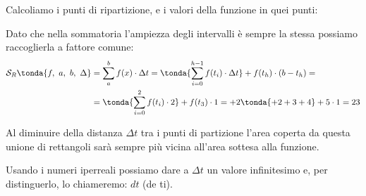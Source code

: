 \begin{esempio}
Calcoliamo i punti di ripartizione, e i valori della funzione in quei 
punti:

\vspace{.5em}

Dato che nella sommatoria l'ampiezza degli intervalli è sempre la stessa 
possiamo raccoglierla a fattore comune:
\begin{align*}
\mathcal{S}_R \tonda{f,~a,~b,~\Delta} &= \sum_a^b f(x) \cdot \Delta t =
   \tonda{\sum_{i=0}^{h -1} f(t_i) \cdot \Delta t} +f(t_h)\cdot(b-t_h) = \\
&= \tonda{\sum_{i=0}^{2} f(t_i) \cdot 2} +f(t_3) \cdot 1 = 
   +2 \tonda{+2+3+4} + 5 \cdot 1 = 23
\end{align*}
\end{esempio}

\begin{newoss*}{}{}
Al diminuire della distanza \(\Delta t\) tra i punti di partizione l'area 
coperta da questa unione di rettangoli sarà sempre più vicina all'area 
sottesa alla funzione.
\end{newoss*}
Usando i numeri iperreali possiamo dare a \(\Delta t\) un valore infinitesimo 
e, per distinguerlo, lo chiameremo: \(dt\) (de ti).

